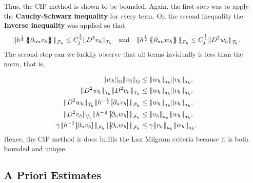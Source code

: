 Thus, the CIP method is shown to be bounded.
Again, the first step was to apply the \textbf{Cauchy-Schwarz inequality} for every term. On the second inequality the \textbf{Inverse inequality} was applied so that
\[
\| h^{\frac{1}{2}} \mean{ \partial _{nn}v_{h} }   \|_{ \mathcal{F} _{h}  }^{  }\le   C_{j}^{\frac{1}{2}} \| D ^2 v_{h} \|_{ \mathcal{T} _{h} }^{  } \quad \text{and} \quad   \| h^{\frac{1}{2}} \mean{ \partial _{nn}w_{h} }   \|_{ \mathcal{F} _{h}
}^{  }\le   C_{j}^{\frac{1}{2}} \| D ^2 w_{h} \|_{ \mathcal{T} _{h} }^{  }.
\]
The second step can we luckily observe that all terms invidually is less than the norm, that is,

\begin{equation}
\label{eq:bounded_ineq}
\begin{split}
\| w_{h} \|_{\Omega    }^{  }  \| v_{h} \|_{ \Omega    }^{  } & \le \| w_{h} \|_{ a_{h} }^{  } \| v_{h} \|_{ a_{h} }^{  }, \\
\| D ^2w_{h} \|_{\mathcal{T}_{h}   }^{  }  \| D ^2v_{h} \|_{\mathcal{T}_{h}   }^{  } & \le \| w_{h} \|_{ a_{h} }^{  } \| v_{h} \|_{ a_{h} }^{  }, \\
\|  D ^2 w_{h} \|_{ \mathcal{T} _{h} }^{ } \| h^{-\frac{1}{2}} \jump{ \partial _{n} v_{h} }   \|_{ \mathcal{F} _{h} }^{  }  & \le  \| w_{h} \|_{ a_{h} }^{  } \| v_{h} \|_{ a_{h} }^{  }, \\
   \|  D ^2 v_{h} \|_{ \mathcal{T} _{h} }^{ } \| h^{-\frac{1}{2}} \jump{ \partial _{n} w_{h} }   \|_{ \mathcal{F} _{h} }^{  }   & \le \| v_{h} \|_{ a_{h} }^{  } \| w_{h} \|_{ a_{h} }^{  }, \\
 \gamma \| h^{-1 } \jump{ \partial _{n} v_{h} }    \|_{ \mathcal{F} _{h}  }^{  }  \| \jump{ \partial _{n} w_{h} }    \|_{\mathcal{F}_{h}   }^{  }   & \le \gamma \| v_{h} \|_{ a_{h} }^{  }  \| w_{h} \|_{ a_{h} }^{  }.
\end{split}
\end{equation}
Hence, the CIP method is does fulfills the Lax Milgram criteria because it is both bounded and unique.


\subsection{A Priori Estimates}%
\label{sub:apriori_estimates}

